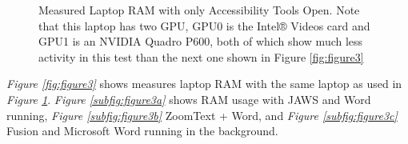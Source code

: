 \begin{figure}[H]
    \caption[Measured Laptop RAM with only Accessibility Tools Open]{Measured Laptop RAM with only Accessibility Tools Open.  Note that this laptop has two GPU, GPU0 is the Intel® Videos card and GPU1 is an NVIDIA Quadro P600, both of which show much less activity in this test than the next one shown in Figure \ref{fig:figure3}}
    \label{fig:figure2}
\end{figure}

\newpage \textit{Figure \ref{fig:figure3}} shows measures laptop RAM with the same laptop as used in \textit{Figure \ref{fig:figure2}}. \textit{Figure \ref{subfig:figure3a}} shows RAM usage with JAWS and Word running, \textit{Figure \ref{subfig:figure3b}} ZoomText + Word, and \textit{Figure \ref{subfig:figure3c}} Fusion and Microsoft Word running in the background.

\begin{figure}[H]
    \centering
     \\   \hfill

\end{figure}
